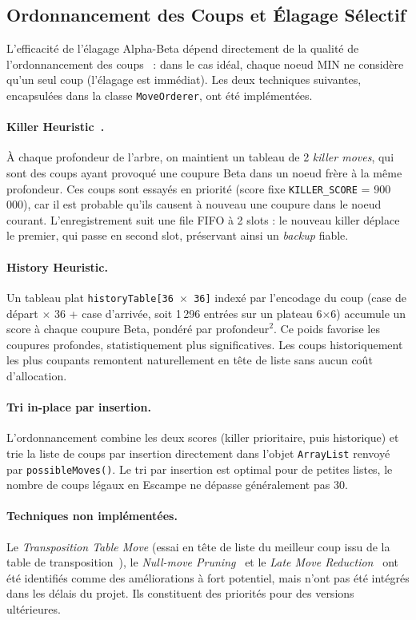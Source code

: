\documentclass[12pt,a4paper]{article}
\begin{document}
\subsection{Ordonnancement des Coups et Élagage Sélectif}
\label{sec-move-ordering}
L'efficacité de l'élagage Alpha-Beta dépend directement de la qualité de l'ordonnancement des coups~\cite{cp_move_ordering} : dans le cas idéal, chaque noeud MIN ne considère qu'un seul coup (l'élagage est immédiat). Les deux techniques suivantes, encapsulées dans la classe \texttt{MoveOrderer}, ont été implémentées.

\paragraph{Killer Heuristic~\cite{cp_killer}.}
À chaque profondeur de l'arbre, on maintient un tableau de 2 \textit{killer moves}, qui sont des coups ayant provoqué une coupure Beta dans un noeud frère à la même profondeur. Ces coups sont essayés en priorité (score fixe \texttt{KILLER\_SCORE} = 900\,000), car il est probable qu'ils causent à nouveau une coupure dans le noeud courant. L'enregistrement suit une file FIFO à 2 slots : le nouveau killer déplace le premier, qui passe en second slot, préservant ainsi un \textit{backup} fiable.

\paragraph{History Heuristic.}
Un tableau plat \texttt{historyTable[36 $\times$ 36]} indexé par l'encodage du coup (case de départ $\times$ 36 + case d'arrivée, soit 1\,296 entrées sur un plateau 6$\times$6) accumule un score à chaque coupure Beta, pondéré par $\text{profondeur}^2$. Ce poids favorise les coupures profondes, statistiquement plus significatives. Les coups historiquement les plus coupants remontent naturellement en tête de liste sans aucun coût d'allocation.

\paragraph{Tri in-place par insertion.}
L'ordonnancement combine les deux scores (killer prioritaire, puis historique) et trie la liste de coups par insertion directement dans l'objet \texttt{ArrayList} renvoyé par \texttt{possibleMoves()}. Le tri par insertion est optimal pour de petites listes, le nombre de coups légaux en Escampe ne dépasse généralement pas 30.

\paragraph{Techniques non implémentées.}
Le \textit{Transposition Table Move} (essai en tête de liste du meilleur coup issu de la table de transposition~\cite{cp_killer}), le \textit{Null-move Pruning}~\cite{cp_nullmove} et le \textit{Late Move Reduction}~\cite{cp_lmr} ont été identifiés comme des améliorations à fort potentiel, mais n'ont pas été intégrés dans les délais du projet. Ils constituent des priorités pour des versions ultérieures.
\end{document}

